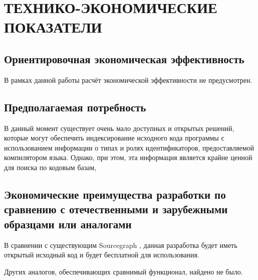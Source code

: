 \section{ТЕХНИКО-ЭКОНОМИЧЕСКИЕ ПОКАЗАТЕЛИ}

\subsection{Ориентировочная экономическая эффективность}
    В рамках данной работы расчёт экономической эффективности не предусмотрен.

\subsection{Предполагаемая потребность}
    В данный момент существует очень мало доступных и открытых решений, которые могут обеспечить индексирование исходного кода программы с использованием информации о типах и ролях идентификаторов, предоставляемой компилятором языка. Однако, при этом, эта информация является крайне ценной для поиска по кодовым базам,

\subsection{Экономические преимущества разработки по сравнению с отечественными и зарубежными образцами или аналогами}
    В сравнении с существующим Sourcegraph \cite{sourcegraph}, данная разработка будет иметь открытый исходный код и будет бесплатной для использования.
    
    Других аналогов, обеспечивающих сравнимый функционал, найдено не было.

\clearpage